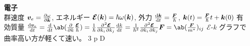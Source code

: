 \documentclass[12pt,a4j,draft]{ltjsarticle}
\renewcommand{\EE}{\bm{\mathcal{E}}}
\begin{document}
\everymath{\displaystyle}
\textbf{電子}\\
群速度 $\bm{v}_e = \diffp{\omega}{\kk}$,
エネルギー $\EE(\kk) = \hbar\omega(\kk)$,
外力 $\diff{\kk}{t} = \frac{\bm{F}}{\hbar}$, $\bm{k}(t) = \frac{\bm{F}}{\hbar}t + \bm{k}(0)$
有効質量 $\diff{\bm{v}_e}{t} = \diff{}{t}\ab(\diffp{}{k}\frac{\EE}{\hbar}) = \frac{1}{\hbar}\diffp{\EE}{k_i,k_j}\diff{k}{t} = \frac{1}{\hbar^2}\diffp{\EE}{k_i,k_j}\bm{F} = \ab(\frac{\bm{F}}{m^*})_{ij}$
$\EE$-$k$ グラフで曲率高い方が軽くて速い。
3 p D
\end{document}
